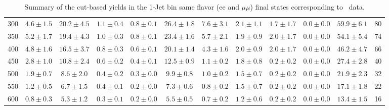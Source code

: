 \begin{table}
{\begin{center}
\begin{tabular}{l c c c c c c c c c c c }
300 & $4.6\pm1.5$ & $20.2\pm4.5$ & $1.1\pm0.4$ & $0.8\pm0.1$ & $26.4\pm1.8$ & $7.6\pm3.1$ & $2.1\pm1.1$ & $1.7\pm1.7$ & $0.0\pm0.0$ & $59.9\pm6.1$ & 80 \\
350 & $5.2\pm1.7$ & $19.4\pm4.3$ & $1.0\pm0.3$ & $0.8\pm0.1$ & $23.4\pm1.6$ & $5.7\pm2.1$ & $1.9\pm0.9$ & $2.0\pm1.7$ & $0.0\pm0.0$ & $54.1\pm5.4$ & 74 \\
400 & $4.8\pm1.6$ & $16.5\pm3.7$ & $0.8\pm0.3$ & $0.6\pm0.1$ & $20.1\pm1.4$ & $4.3\pm1.6$ & $2.0\pm0.9$ & $2.0\pm1.7$ & $0.0\pm0.0$ & $46.2\pm4.7$ & 66 \\
450 & $2.8\pm1.0$ & $10.8\pm2.4$ & $0.6\pm0.2$ & $0.4\pm0.1$ & $12.5\pm0.9$ & $1.1\pm0.2$ & $1.8\pm0.8$ & $0.2\pm0.2$ & $0.0\pm0.0$ & $27.4\pm2.8$ & 40 \\
500 & $1.9\pm0.7$ & $8.6\pm2.0$ & $0.4\pm0.2$ & $0.3\pm0.0$ & $9.9\pm0.8$ & $1.0\pm0.2$ & $1.5\pm0.7$ & $0.2\pm0.2$ & $0.0\pm0.0$ & $21.9\pm2.3$ & 32 \\
550 & $1.2\pm0.5$ & $6.7\pm1.5$ & $0.4\pm0.1$ & $0.2\pm0.0$ & $7.3\pm0.6$ & $0.8\pm0.2$ & $1.5\pm0.7$ & $0.2\pm0.2$ & $0.0\pm0.0$ & $17.1\pm1.8$ & 22 \\
600 & $0.8\pm0.3$ & $5.3\pm1.2$ & $0.3\pm0.1$ & $0.2\pm0.0$ & $5.5\pm0.5$ & $0.7\pm0.2$ & $1.2\pm0.6$ & $0.2\pm0.2$ & $0.0\pm0.0$ & $13.4\pm1.5$ & 16 \\
\hline
\end{tabular}
\end{center}
}
\caption{Summary of the cut-based yields in the 1-Jet bin same flavor (ee and $\mu\mu$) final states corresponding to \intlumi\ data.}
\end{table}
